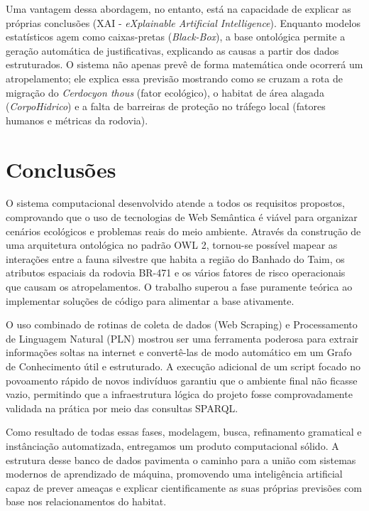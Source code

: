 \documentclass[10pt,conference]{IEEEtran}
\begin{document}
Uma vantagem dessa abordagem, no entanto, está na capacidade de explicar as próprias conclusões (XAI - \textit{eXplainable Artificial Intelligence}). Enquanto modelos estatísticos agem como caixas-pretas (\textit{Black-Box}), a base ontológica permite a geração automática de justificativas, explicando as causas a partir dos dados estruturados. O sistema não apenas prevê de forma matemática onde ocorrerá um atropelamento; ele explica essa previsão mostrando como se cruzam a rota de migração do \textit{Cerdocyon thous} (fator ecológico), o habitat de área alagada (\textit{CorpoHidrico}) e a falta de barreiras de proteção no tráfego local (fatores humanos e métricas da rodovia).

\section{Conclusões}
O sistema computacional desenvolvido atende a todos os requisitos propostos, comprovando que o uso de tecnologias de Web Semântica é viável para organizar cenários ecológicos e problemas reais do meio ambiente. Através da construção de uma arquitetura ontológica no padrão OWL 2, tornou-se possível mapear as interações entre a fauna silvestre que habita a região do Banhado do Taim, os atributos espaciais da rodovia BR-471 e os vários fatores de risco operacionais que causam os atropelamentos. O trabalho superou a fase puramente teórica ao implementar soluções de código para alimentar a base ativamente.

O uso combinado de rotinas de coleta de dados (Web Scraping) e Processamento de Linguagem Natural (PLN) mostrou ser uma ferramenta poderosa para extrair informações soltas na internet e convertê-las de modo automático em um Grafo de Conhecimento útil e estruturado. A execução adicional de um script focado no povoamento rápido de novos indivíduos garantiu que o ambiente final não ficasse vazio, permitindo que a infraestrutura lógica do projeto fosse comprovadamente validada na prática por meio das consultas SPARQL. 

Como resultado de todas essas fases, modelagem, busca, refinamento gramatical e instânciação automatizada, entregamos um produto computacional sólido. A estrutura desse banco de dados pavimenta o caminho para a união com sistemas modernos de aprendizado de máquina, promovendo uma inteligência artificial capaz de prever ameaças e explicar cientificamente as suas próprias previsões com base nos relacionamentos do habitat.
\end{document}
